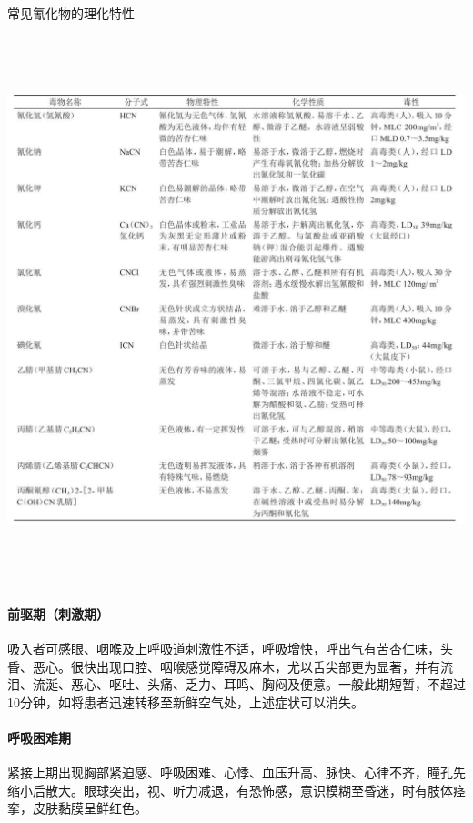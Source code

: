 \begin{table}[htbp]
\centering
\caption{常见氰化物的理化特性}
\label{tab56-1}
\includegraphics[width=6.69792in,height=6.27083in]{./images/Image00215.jpg}
\end{table}

\paragraph{前驱期（刺激期）}

吸入者可感眼、咽喉及上呼吸道刺激性不适，呼吸增快，呼出气有苦杏仁味，头昏、恶心。很快出现口腔、咽喉感觉障碍及麻木，尤以舌尖部更为显著，并有流泪、流涎、恶心、呕吐、头痛、乏力、耳鸣、胸闷及便意。一般此期短暂，不超过10分钟，如将患者迅速转移至新鲜空气处，上述症状可以消失。

\paragraph{呼吸困难期}

紧接上期出现胸部紧迫感、呼吸困难、心悸、血压升高、脉快、心律不齐，瞳孔先缩小后散大。眼球突出，视、听力减退，有恐怖感，意识模糊至昏迷，时有肢体痉挛，皮肤黏膜呈鲜红色。

